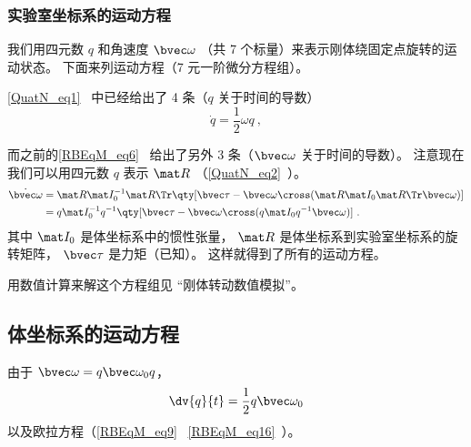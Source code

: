 
\begin{issues}
\issueAbstract
\end{issues}


\subsubsection{实验室坐标系的运动方程}
我们用四元数 $q$ 和角速度 $\bvec \omega$ （共 7 个标量）来表示刚体绕固定点旋转的运动状态。 下面来列运动方程（7 元一阶微分方程组）。

\autoref{QuatN_eq1}~ 中已经给出了 4 条（$q$ 关于时间的导数）
\begin{equation}
\dot{q} = \frac12 \omega q~,
\end{equation}

而之前的\autoref{RBEqM_eq6}~ 给出了另外 3 条（$\bvec\omega$ 关于时间的导数）。 注意现在我们可以用四元数 $q$ 表示 $\mat R$ （\autoref{QuatN_eq2}~）。
\begin{equation}
\begin{aligned}
\dot{\bvec \omega} &= \mat R \mat I_0^{-1} \mat R\Tr \qty[\bvec \tau  - \bvec\omega\cross(\mat R \mat I_0 \mat R\Tr \bvec\omega)]\\
&= q \mat I_0^{-1} q^{-1} \qty[\bvec \tau  - \bvec\omega\cross(q \mat I_0 q^{-1}\bvec\omega)]~.
\end{aligned}
\end{equation}
其中 $\mat I_0$ 是体坐标系中的惯性张量， $\mat R$ 是体坐标系到实验室坐标系的旋转矩阵， $\bvec\tau$ 是力矩（已知）。 这样就得到了所有的运动方程。

用数值计算来解这个方程组见 “刚体转动数值模拟”。

\subsection{体坐标系的运动方程}
由于 $\bvec\omega = q\bvec\omega_0 q$，
\begin{equation}
\dv{q}{t} = \frac12 q \bvec \omega_0
\end{equation}
以及欧拉方程（\autoref{RBEqM_eq9}~ \autoref{RBEqM_eq16}~）。
